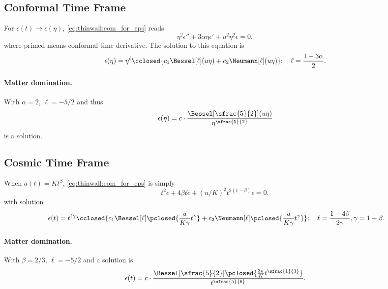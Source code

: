 \subsection{Conformal Time Frame}
    For $\epsilon(t)\to \epsilon(\eta),~$\cref{eq:thinwall:eom_for_eps} reads
    \begin{equation}
        \eta^2 \epsilon'' + 3 \alpha\eta \epsilon' +  u^2 \eta^2\epsilon = 0,
    \end{equation}
    where primed means conformal time derivative.
    The solution to this equation is 
    \begin{equation}
        \epsilon(\eta) = \eta^\ell \cclosed{ c_1 \Bessel[\ell](u\eta) + c_2 \Neumann[\ell](u\eta) }; \quad \ell = \frac{1-3\alpha}{2}.%
    \end{equation}
    
    \paragraph{Matter domination.} %
    With $\alpha=2$, $\ell = -5/2$ and thus
    \begin{equation}\label{eq:thinwall:eps_sol_MD}
        \epsilon(\eta) = c \cdot \frac{\Bessel[\sfrac{5}{2}](u\eta)}{\eta^{\sfrac{5}{2}}} 
    \end{equation}
    is a solution.


\subsection{Cosmic Time Frame}
    When $a(t)= Kt^\beta$, \cref{eq:thinwall:eom_for_eps} is simply
    \begin{equation}
        t^2 \ddot{\epsilon} + 4\beta  t\dot{\epsilon} +  (u/K)^2 t^{2(1-\beta)} \epsilon = 0,
    \end{equation}
    with solution
    \begin{equation}\
        \epsilon(t) = t^{\ell\gamma} \cclosed{ c_1 \Bessel[\ell]\pclosed{ \frac{u}{K\gamma}t^{\gamma} } +c_2 \Neumann[\ell]\pclosed{ \frac{u}{K\gamma}t^{\gamma} }  }; \quad \ell = \frac{1-4\beta}{2\gamma}, \gamma = 1-\beta.
    \end{equation}


    \paragraph{Matter domination.} %
    With $\beta = 2/3$, $\ell = -5/2$ and a solution is
    \begin{equation}
        \epsilon(t) = c\cdot \frac{\Bessel[\sfrac{5}{2}]\pclosed{ \frac{3u}{K}t^{\sfrac{1}{3}} } }{ t^{\sfrac{5}{6}} }.
    \end{equation}



